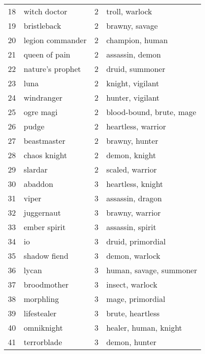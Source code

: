 \documentclass{article}
\begin{document}
\begin{table}
{\begin{tabular}{llrl}
18 &         witch doctor &      2 &                troll, warlock  \\
19 &          bristleback &      2 &                 brawny, savage \\
20 &     legion commander &      2 &                champion, human \\
21 &        queen of pain &      2 &                assassin, demon \\
22 &     nature's prophet &      2 &                druid, summoner \\
23 &                 luna &      2 &               knight, vigilant \\
24 &           windranger &      2 &               hunter, vigilant \\
25 &            ogre magi &      2 &       blood-bound, brute, mage \\
26 &                pudge &      2 &            heartless, warrior  \\
27 &          beastmaster &      2 &                 brawny, hunter \\
28 &         chaos knight &      2 &                  demon, knight \\
29 &              slardar &      2 &               scaled, warrior  \\
30 &              abaddon &      3 &              heartless, knight \\
31 &                viper &      3 &               assassin, dragon \\
32 &           juggernaut &      3 &               brawny, warrior  \\
33 &         ember spirit &      3 &               assassin, spirit \\
34 &                   io &      3 &              druid, primordial \\
35 &         shadow fiend &      3 &                demon, warlock  \\
36 &                lycan &      3 &        human, savage, summoner \\
37 &          broodmother &      3 &               insect, warlock  \\
38 &            morphling &      3 &               mage, primordial \\
39 &          lifestealer &      3 &               brute, heartless \\
40 &           omniknight &      3 &          healer, human, knight \\
41 &          terrorblade &      3 &                  demon, hunter \\

\end{tabular}}
\end{table}
\end{document}
